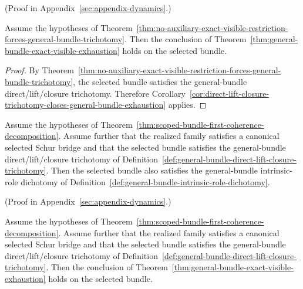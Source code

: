 (Proof in Appendix~\ref{sec:appendix-dynamics}.)

\begin{corollary}
\label{cor:no-auxiliary-exact-visible-restriction-closes-general-bundle-exhaustion}
Assume the hypotheses of
Theorem~\ref{thm:no-auxiliary-exact-visible-restriction-forces-general-bundle-trichotomy}.
Then the conclusion of
Theorem~\ref{thm:general-bundle-exact-visible-exhaustion} holds on the selected
bundle.
\end{corollary}

\begin{proof}
By
Theorem~\ref{thm:no-auxiliary-exact-visible-restriction-forces-general-bundle-trichotomy},
the selected bundle satisfies the general-bundle direct/lift/closure
trichotomy. Therefore
Corollary~\ref{cor:direct-lift-closure-trichotomy-closes-general-bundle-exhaustion}
applies.
\end{proof}

\begin{theorem}
\label{thm:direct-lift-closure-trichotomy-forces-intrinsic-role-dichotomy}
Assume the hypotheses of
Theorem~\ref{thm:scoped-bundle-first-coherence-decomposition}. Assume further
that the realized family satisfies a canonical selected Schur bridge and that
the selected bundle satisfies the general-bundle direct/lift/closure
trichotomy of
Definition~\ref{def:general-bundle-direct-lift-closure-trichotomy}. Then the
selected bundle also satisfies the general-bundle intrinsic-role dichotomy of
Definition~\ref{def:general-bundle-intrinsic-role-dichotomy}.
\end{theorem}

(Proof in Appendix~\ref{sec:appendix-dynamics}.)

\begin{corollary}
\label{cor:direct-lift-closure-trichotomy-closes-general-bundle-exhaustion}
Assume the hypotheses of
Theorem~\ref{thm:scoped-bundle-first-coherence-decomposition}. Assume further
that the realized family satisfies a canonical selected Schur bridge and that
the selected bundle satisfies the general-bundle direct/lift/closure
trichotomy of
Definition~\ref{def:general-bundle-direct-lift-closure-trichotomy}. Then the
conclusion of
Theorem~\ref{thm:general-bundle-exact-visible-exhaustion} holds on the selected
bundle.
\end{corollary}

